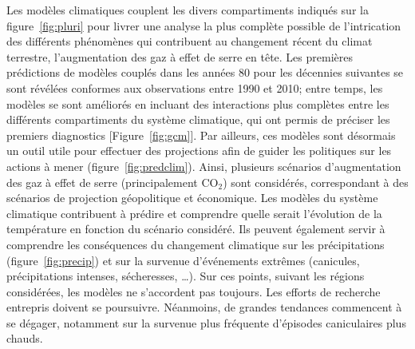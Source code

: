 \sk
Les modèles climatiques couplent les divers compartiments indiqués sur la figure~\ref{fig:pluri} pour livrer une analyse la plus complète possible de l'intrication des différents phénomènes qui contribuent au changement récent du climat terrestre, l'augmentation des gaz à effet de serre en tête. Les premières prédictions de modèles couplés dans les années 80 pour les décennies suivantes se sont révélées conformes aux observations entre 1990 et 2010; entre temps, les modèles se sont améliorés en incluant des interactions plus complètes entre les différents compartiments du système climatique, qui ont permis de préciser les premiers diagnostics [Figure~\ref{fig:gcm}].
Par ailleurs, ces modèles sont désormais un outil utile pour effectuer des projections afin de guider les politiques sur les actions à mener (figure~\ref{fig:predclim}). Ainsi, plusieurs scénarios d'augmentation des gaz à effet de serre (principalement CO$_2$) sont considérés, correspondant à des scénarios de projection géopolitique et économique. Les modèles du système climatique contribuent à prédire et comprendre quelle serait l'évolution de la température en fonction du scénario considéré. Ils peuvent également servir à comprendre les conséquences du changement climatique sur les précipitations (figure~\ref{fig:precip}) et sur la survenue d'événements extrêmes (canicules, précipitations intenses, sécheresses, \ldots). Sur ces points, suivant les régions considérées, les modèles ne s'accordent pas toujours. Les efforts de recherche entrepris doivent se poursuivre. Néanmoins, de grandes tendances commencent à se dégager, notamment sur la survenue plus fréquente d'épisodes caniculaires plus chauds.



